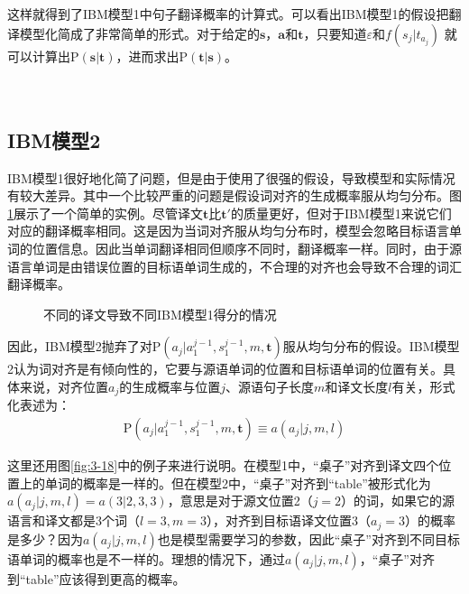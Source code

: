\parinterval 这样就得到了IBM模型1中句子翻译概率的计算式。可以看出IBM模型1的假设把翻译模型化简成了非常简单的形式。对于给定的$\mathbf{s}$，$\mathbf{a}$和$\mathbf{t}$，只要知道$\varepsilon$和$f(s_j |t_{a_j })$ 就可以计算出$\textrm{P}(\mathbf{s}| \mathbf{t})$，进而求出$\textrm{P}(\mathbf{t}| \mathbf{s})$。\\ \\ \\

\vspace{-4em}
\subsection{IBM模型2}

\parinterval IBM模型1很好地化简了问题，但是由于使用了很强的假设，导致模型和实际情况有较大差异。其中一个比较严重的问题是假设词对齐的生成概率服从均匀分布。图\ref{fig:3-20}展示了一个简单的实例。尽管译文$\mathbf{t}$比$\mathbf{t}'$的质量更好，但对于IBM模型1来说它们对应的翻译概率相同。这是因为当词对齐服从均匀分布时，模型会忽略目标语言单词的位置信息。因此当单词翻译相同但顺序不同时，翻译概率一样。同时，由于源语言单词是由错误位置的目标语单词生成的，不合理的对齐也会导致不合理的词汇翻译概率。

\begin{figure}[htp]
    \centering

    \caption{不同的译文导致不同IBM模型1得分的情况}
    \label{fig:3-20}
\end{figure}

\parinterval 因此，IBM模型2抛弃了对$\textrm{P}(a_j|a_1^{j-1},s_1^{j-1},m,\mathbf{t})$服从均匀分布的假设。IBM模型2认为词对齐是有倾向性的，它要与源语单词的位置和目标语单词的位置有关。具体来说，对齐位置$a_j$的生成概率与位置$j$、源语句子长度$m$和译文长度$l$有关，形式化表述为：
\begin{eqnarray}
\textrm{P}(a_j|a_1^{j-1},s_1^{j-1},m,\mathbf{t}) \equiv a(a_j|j,m,l)
\label{eq:3-25}
\end{eqnarray}

\parinterval 这里还用图\ref{fig:3-18}中的例子来进行说明。在模型1中，``桌子''对齐到译文四个位置上的单词的概率是一样的。但在模型2中，``桌子''对齐到``table''被形式化为$a(a_j |j,m,l)=a(3|2,3,3)$，意思是对于源文位置2（$j=2$）的词，如果它的源语言和译文都是3个词（$l=3,m=3$），对齐到目标语译文位置3（$a_j=3$）的概率是多少？因为$a(a_j|j,m,l)$也是模型需要学习的参数，因此``桌子''对齐到不同目标语单词的概率也是不一样的。理想的情况下，通过$a(a_j|j,m,l)$，``桌子''对齐到``table''应该得到更高的概率。


